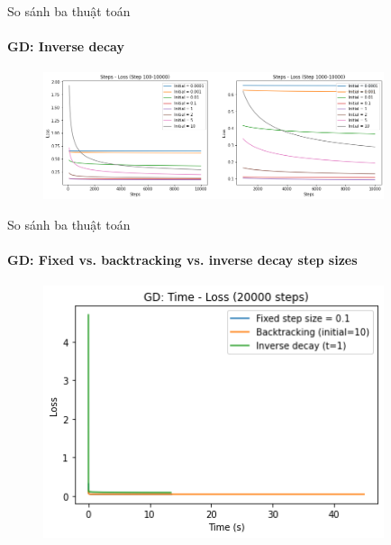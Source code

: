 \documentclass[10pt]{beamer}
\theoremstyle{remark}
\theoremstyle{definition}
\begin{document}
\begin{frame}{So sánh ba thuật toán}
	\framesubtitle{GD: Inverse decay}

	\begin{figure}
		\centering
		\includegraphics[width=10cm]{Thinh/8.png}
	\end{figure}
\end{frame}

\begin{frame}{So sánh ba thuật toán}
	\framesubtitle{GD: Fixed vs. backtracking vs. inverse decay step sizes}
	\begin{figure}
		\centering
		\includegraphics[width=10cm]{Thinh/9.png}
	\end{figure}

\end{frame}
\end{document}

